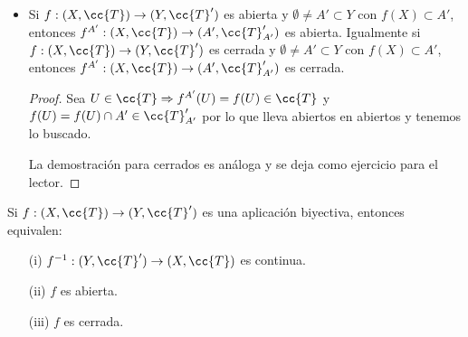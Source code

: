 \begin{ejemplo}
\begin{itemize}
        \item Si $f:(X, \cc{T})\to (Y, \cc{T}')$ es abierta y $\emptyset \neq A' \subset Y $ con $f(X)\subset A'$, entonces $f^{A'}:(X, \cc{T})\to (A', \cc{T}_{A'}')$ es abierta. Igualmente si $f:(X, \cc{T})\to (Y, \cc{T}')$ es cerrada y $\emptyset \neq A' \subset Y $ con $f(X)\subset A'$, entonces $f^{A'}:(X, \cc{T})\to (A', \cc{T}_{A'}')$ es cerrada.
        \begin{proof}
            Sea $U\in \cc{T} \Rightarrow f^{A'}(U)=f(U)\in \cc{T}$ y $f(U)=f(U)\cap A'\in \cc{T}_{A'}'$ por lo que lleva abiertos en abiertos y tenemos lo buscado.

            La demostración para cerrados es análoga y se deja como ejercicio para el lector.

        \end{proof}
    \end{itemize}
\end{ejemplo}

\begin{observacion}
    Si $f:(X, \cc{T})\to(Y, \cc{T}')$ es una aplicación biyectiva, entonces equivalen:
    \begin{enumerate}
        \item[(i)] $f^{-1}:(Y, \cc{T}')\to (X, \cc{T})$ es continua.
        \item[(ii)] $f$ es abierta.
        \item[(iii)] $f$ es cerrada. 
    \end{enumerate}


\end{observacion}

